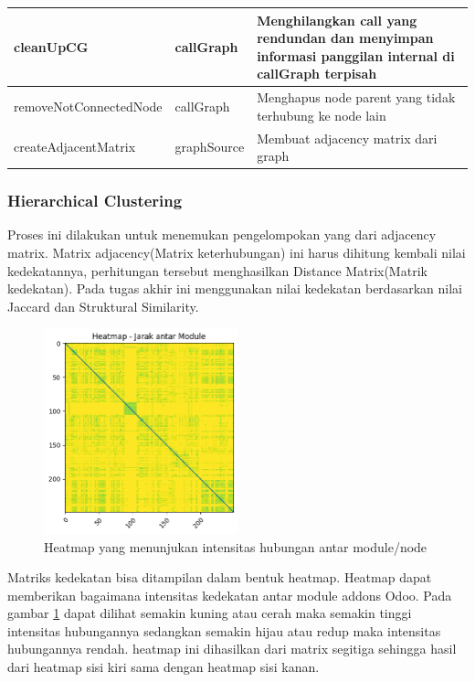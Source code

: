 \begin{small}
\begin{longtable}{|p{4cm}|p{3cm}|p{6cm}|}
		 
		 \hline
		

		 
		 cleanUpCG
		 
			& callGraph
		 & Menghilangkan call yang rendundan dan  menyimpan informasi panggilan internal di callGraph terpisah\\

		 \hline
		 removeNotConnectedNode
		& callGraph
		 & Menghapus node parent yang tidak terhubung ke node lain \\
		

		 \hline  
		createAdjacentMatrix
		& graphSource
		 & Membuat adjacency matrix dari graph  \\
		
		 \hline  
		 
	\end{longtable}
\end{small}
\endgroup



\subsubsection{Hierarchical Clustering}
Proses ini dilakukan untuk menemukan pengelompokan yang dari adjacency matrix. Matrix adjacency(Matrix keterhubungan) ini harus dihitung kembali nilai kedekatannya, perhitungan tersebut menghasilkan Distance Matrix(Matrik kedekatan). Pada tugas akhir ini menggunakan nilai kedekatan berdasarkan nilai Jaccard dan Struktural Similarity. 

\begin{figure}[htbp]
	\centering
	\includegraphics[width=0.5\textwidth]{img/bab_4/HeatmapModule.png}
	\caption{Heatmap yang menunjukan intensitas hubungan antar module/node}
	\label{fig:heatmap_gambar}
\end{figure}

Matriks kedekatan bisa ditampilan dalam bentuk heatmap. Heatmap dapat memberikan bagaimana intensitas kedekatan antar module addons Odoo. Pada gambar \ref{fig:heatmap_gambar} dapat dilihat semakin kuning atau cerah maka semakin tinggi intensitas hubungannya sedangkan semakin hijau atau redup maka intensitas hubungannya rendah. heatmap ini dihasilkan dari matrix segitiga sehingga hasil dari heatmap sisi kiri sama dengan heatmap sisi kanan.



